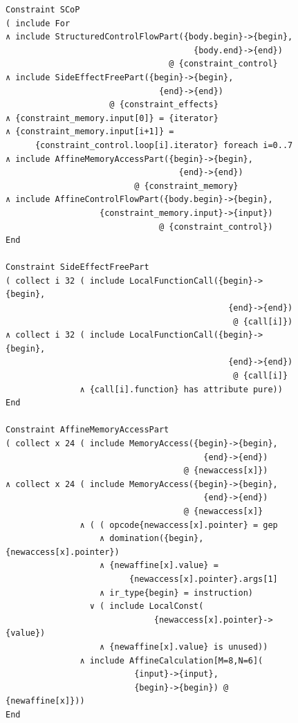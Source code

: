 \begin{figure}[p]
\begin{lstlisting}[language=CAnDL, label=polyhedralCAnDL, caption=
   {Fragments from the specification of Scalar Control Parts (SCoPs) in CAnDL:
    In lines 1--18, SCoPs are defined by combining multiple restrictions on
    loop nests.
    These restrictions are then individually implemented in CAnDL, including the
    {\tt SideEffectFreePart} and {\tt AffineMemoryAccessPart}
    conditions that are shown.
    The entire listing is in Appendix \ref{appendix:CAnDLpoly}.}]
Constraint SCoP
( include For
∧ include StructuredControlFlowPart({body.begin}->{begin},
                                      {body.end}->{end})
                                 @ {constraint_control}
∧ include SideEffectFreePart({begin}->{begin},
                               {end}->{end})
                     @ {constraint_effects}
∧ {constraint_memory.input[0]} = {iterator}
∧ {constraint_memory.input[i+1]} =
      {constraint_control.loop[i].iterator} foreach i=0..7
∧ include AffineMemoryAccessPart({begin}->{begin},
                                   {end}->{end})
                          @ {constraint_memory}
∧ include AffineControlFlowPart({body.begin}->{begin},
                   {constraint_memory.input}->{input})
                               @ {constraint_control})
End

Constraint SideEffectFreePart
( collect i 32 ( include LocalFunctionCall({begin}->{begin},
                                             {end}->{end})
                                              @ {call[i]}) 
∧ collect i 32 ( include LocalFunctionCall({begin}->{begin},
                                             {end}->{end})
                                              @ {call[i]}
               ∧ {call[i].function} has attribute pure))
End

Constraint AffineMemoryAccessPart
( collect x 24 ( include MemoryAccess({begin}->{begin},
                                        {end}->{end})
                                    @ {newaccess[x]})
∧ collect x 24 ( include MemoryAccess({begin}->{begin},
                                        {end}->{end})
                                    @ {newaccess[x]}
               ∧ ( ( opcode{newaccess[x].pointer} = gep
                   ∧ domination({begin}, {newaccess[x].pointer})
                   ∧ {newaffine[x].value} =
                         {newaccess[x].pointer}.args[1]
                   ∧ ir_type{begin} = instruction)
                 ∨ ( include LocalConst(
                              {newaccess[x].pointer}->{value})
                   ∧ {newaffine[x].value} is unused))
               ∧ include AffineCalculation[M=8,N=6](
                          {input}->{input},
                          {begin}->{begin}) @ {newaffine[x]}))
End
\end{lstlisting}
\end{figure}

